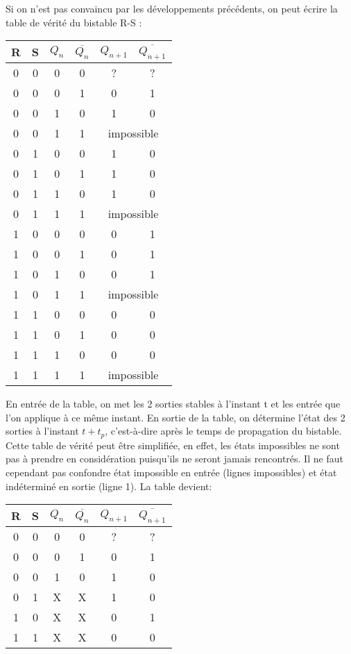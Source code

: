 \documentclass{../template/labo}
\begin{document}
\begin{info}
Si on n'est pas convaincu par les développements précédents, on peut écrire la table de vérité du
bistable R-S :

\begin{center}
\begin{tabular}{cccc|cc}
R & S & $Q_n$ & $\overline{Q_n}$ & $Q_{n+1}$ & $\overline{Q_{n+1}}$ \\
\hline
0 & 0 & 0 & 0 & ? & ? \\
0 & 0 & 0 & 1 & 0 & 1 \\
0 & 0 & 1 & 0 & 1 & 0 \\
0 & 0 & 1 & 1 &  \multicolumn{2}{c}{impossible} \\
0 & 1 & 0 & 0 & 1 & 0 \\
0 & 1 & 0 & 1 & 1 & 0 \\
0 & 1 & 1 & 0 & 1 & 0 \\
0 & 1 & 1 & 1 & \multicolumn{2}{c}{impossible}  \\
1 & 0 & 0 & 0 & 0 & 1 \\
1 & 0 & 0 & 1 & 0 & 1 \\
1 & 0 & 1 & 0 & 0 & 1 \\
1 & 0 & 1 & 1 & \multicolumn{2}{c}{impossible}  \\
1 & 1 & 0 & 0 & 0 & 0 \\
1 & 1 & 0 & 1 & 0 & 0 \\
1 & 1 & 1 & 0 & 0 & 0 \\
1 & 1 & 1 & 1 & \multicolumn{2}{c}{impossible}  \\
\end{tabular}
\end{center}

En entrée de la table, on met les 2 sorties stables à l'instant t et les entrée que l'on applique à ce
même instant. En sortie de la table, on détermine l'état des 2 sorties à l'instant $t+t_p$, c'est-à-dire après le
temps de propagation du bistable.
Cette table de vérité peut être simplifiée, en effet, les états impossibles ne sont pas à prendre en
considération puisqu'ils ne seront jamais rencontrés. Il ne faut cependant pas confondre état
impossible en entrée (lignes impossibles) et état indéterminé en sortie (ligne 1). La table devient:


\begin{center}
\begin{tabular}{cccc|cc}
R & S & $Q_n$ & $\overline{Q_n}$ & $Q_{n+1}$ & $\overline{Q_{n+1}}$ \\
\hline
0 & 0 & 0 & 0 & ? & ? \\
0 & 0 & 0 & 1 & 0 & 1 \\
0 & 0 & 1 & 0 & 1 & 0 \\
0 & 1 & X & X & 1 & 0 \\
1 & 0 & X & X & 0 & 1 \\
1 & 1 & X & X & 0 & 0 \\
\end{tabular}
\end{center}


\end{info}
\end{document}
